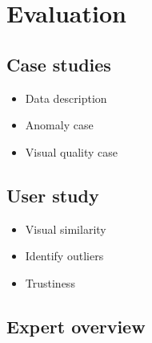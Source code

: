 \section{Evaluation}
\subsection{Case studies}
\begin{itemize}[noitemsep]
    \item Data description
    \item Anomaly case
    \item Visual quality case
\end{itemize}

\subsection{User study}
\begin{itemize}[noitemsep]
    \item Visual similarity
    \item Identify outliers
    \item Trustiness 
\end{itemize}

\subsection{Expert overview}

